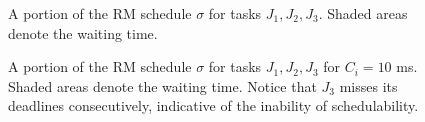 \begin{sidewaysfigure}
  \begin{figure}[H]\centering
    \scalebox{0.7}{}
    \caption{A portion of the RM schedule $\sigma$ for tasks $J_1, J_2, J_3$.
      Shaded areas denote the waiting time.}
    \label{fig:rm_6}
  \end{figure}

  \begin{figure}[H]\centering
    \scalebox{0.7}{}
    \caption{A portion of the RM schedule $\sigma$ for tasks $J_1, J_2, J_3$ for
      $C_i = 10$ ms.  Shaded areas denote the waiting time. Notice that $J_3$
      misses its deadlines consecutively, indicative of the inability of
      schedulability.}
    \label{fig:rm_10}
  \end{figure}
\end{sidewaysfigure}
